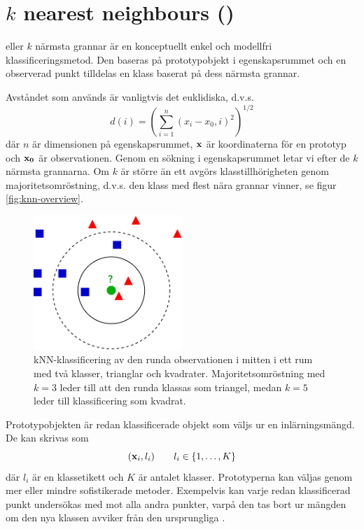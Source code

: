 \documentclass[../rapport_MVEX01-11-05]{subfiles}
\begin{document}
\section{$k$ nearest neighbours (\knn)}\label{sec:knn}

\knn eller $k$ närmsta grannar är en konceptuellt enkel och modellfri
klassificeringsmetod.
Den baseras på prototypobjekt i egenskapsrummet och en observerad punkt
tilldelas en klass baserat på dess närmsta grannar.

Avståndet som används är vanligtvis det euklidiska, d.v.s.
\begin{equation*}
    d(i) = \left(\sum_{i=1}^n(x_i-x_0,i)^2\right)^{1/2}
\end{equation*}
där $n$ är dimensionen på egenskapsrummet, $\mathbf{x}$ är koordinaterna för en
prototyp och $\mathbf{x_0}$ är observationen. Genom en sökning i
egenskapsrummet letar vi efter de $k$ närmsta grannarna. Om $k$ är större än ett
avgörs klasstillhörigheten genom majoritetsomröstning, d.v.s. den klass med flest
nära grannar vinner, se figur \vref{fig:knn-overview}.

\begin{figure}[tb]
    \begin{center}
\includegraphics[width=0.5\textwidth]{bilder/KnnClassification}
    \end{center}
    \caption{kNN-klassificering av den runda observationen i mitten i ett rum
    med två klasser, trianglar och kvadrater. Majoritetsomröstning
    med $k=3$ leder till att den runda klassas som triangel, medan $k=5$ leder
    till klassificering som kvadrat.}
    \label{fig:knn-overview}
\end{figure}

Prototypobjekten är redan klassificerade objekt som väljs ur en inlärningsmängd.
De kan skrivas som
\begin{equation*}
    (\mathbf{x}_i, l_i)\qquad l_i \in \{ 1,\dotsc,K \}
\end{equation*}
där $l_i$ är en klassetikett och $K$ är antalet klasser.
Prototyperna kan väljas genom mer eller mindre sofistikerade metoder.
Exempelvis kan varje redan klassificerad punkt undersökas med \knn mot
alla andra punkter, varpå den tas bort ur mängden om den nya klassen avviker
från den ursprungliga \cite{Mazurowski11}.
\end{document}

